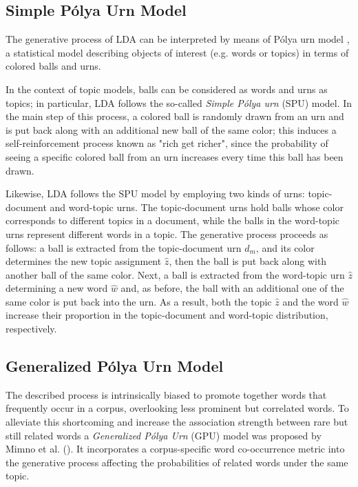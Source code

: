 \documentclass[letterpaper]{article}
\begin{document}
\subsection{Simple P\'{o}lya Urn Model}
The generative process of LDA can be interpreted by means of P\'{o}lya urn model \cite{Mahmoud08}, a statistical model describing objects of interest (e.g. words or topics) in terms of colored balls and urns.

In the context of topic models, balls can be considered as words and urns as topics; in particular, LDA follows the so-called \textit{Simple P\'{o}lya urn} (SPU) model. In the main step of this process, a colored ball is randomly drawn from an urn and is put back along with an additional new ball of the same color; this induces a self-reinforcement process known as "rich get richer", since the probability of seeing a specific colored ball from an urn increases every time this ball has been drawn.

Likewise, LDA follows the SPU model by employing two kinds of urns: topic-document and word-topic urns. The topic-document urns hold balls whose color corresponds to different topics in a document, while the balls in the word-topic urns represent different words in a topic.
The generative process proceeds as follows: a ball is extracted from the topic-document urn $d_m$, and its color determines the new topic assignment $\hat{z}$, then the ball is put back along with another ball of the same color. Next, a ball is extracted from the word-topic urn $\hat{z}$ determining a new word $\hat{w}$ and, as before, the ball with an additional one of the same color is put back into the urn.
As a result, both the topic $\hat{z}$ and the word $\hat{w}$ increase their proportion in the topic-document and word-topic distribution, respectively.


\subsection{Generalized P\'{o}lya Urn Model}
The described process is intrinsically biased to promote together words that frequently occur in a corpus, overlooking less prominent but correlated words. To alleviate this shortcoming and increase the association strength between rare but still related words a \textit{Generalized P\'{o}lya Urn} (GPU) model was proposed by  Mimno et al. (\citeyear{Mimno11}). It incorporates a corpus-specific word co-occurrence metric into the generative process affecting the probabilities of related words under the same topic.
\end{document}
